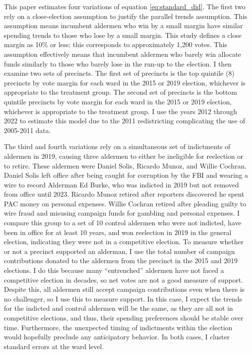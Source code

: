This paper estimates four variations of equation \ref{eq:standard_did}. 
The first two rely on a close-election assumption to justify the parallel trends assumption. 
This assumption means incumbent aldermen who win by a small margin have similar spending trends to those who lose by a small margin.
This study defines a close margin as 10\% or less; this corresponds to approximately 1,200 votes.
This assumption effectively means that incumbent aldermen who barely win allocate funds similarly to those who barely lose in the run-up to the election.
I then examine two sets of precincts. 
The first set of precincts is the top quintile (8) precincts by vote margin for each ward in the 2015 or 2019 election, whichever is appropriate to the treatment group. 
The second set of precincts is the bottom quintile precincts by vote margin for each ward in the 2015 or 2019 election, whichever is appropriate to the treatment group.
I use the years 2012 through 2022 to estimate this model due to the 2011 redistricting complicating the use of 2005-2011 data. 

The third and fourth variations rely on a simultaneous set of indictments of aldermen in 2019, causing three aldermen to either be ineligible for reelection or to retire. 
These aldermen were Daniel Solis, Ricardo Munoz, and Willie Cochran. 
Daniel Solis left office after being caught for corruption by the FBI and wearing a wire to record Alderman Ed Burke, who was indicted in 2019 but not removed from office until 2023.
Ricardo Munoz retired after reporters discovered he spent PAC money on personal expenses.
Willie Cochran retired after pleading guilty to wire fraud and misusing campaign funds for gambling and personal expenses.
I compare this group to a set of 10 control aldermen who were not indicted, have been in office for at least 10 years, and won reelection in 2019 in the general election, indicating they were not in a competitive election. 
To measure whether or not a precinct supported an alderman, I use the total number of campaign contributions donated to the aldermen from the precinct in the 2015 and 2019 elections.
I do this because many ``entrenched'' aldermen have not faced a competitive election in decades, so net votes are not a good measure of support.
Despite this, all aldermen still accept campaign contributions even when there is no challenger, so I use this to measure support.
In this case, I expect the trends for the indicted and control aldermen will be the same, as they are all not in competitive elections, and thus, their spending preferences should be stable over time.
Furthermore, the unexpected timing of indictments within the election would hopefully preclude any anticipatory behavior.
In both cases, I cluster standard errors at the ward level.